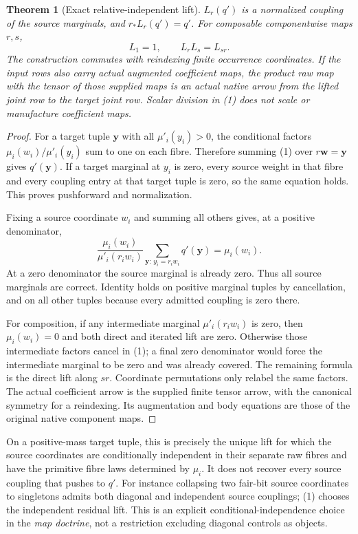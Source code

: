 \documentclass[11pt]{article}
\newtheorem{theorem}{Theorem}\newtheorem{proposition}[theorem]{Proposition}
\begin{document}
\begin{theorem}[Exact relative-independent lift]
$L_r(q')$ is a normalized coupling of the source marginals, and
$r_*L_r(q')=q'$. For composable componentwise maps $r,s$,
\[
 L_1=1,\qquad L_rL_s=L_{sr}.\tag{2}
\]
The construction commutes with reindexing finite occurrence coordinates. If the input rows also carry actual augmented coefficient maps, the product raw map with the tensor of those supplied maps is an actual native arrow from the lifted joint row to the target joint row. Scalar division in (1) does not scale or manufacture coefficient maps.
\end{theorem}
\begin{proof}
For a target tuple $\mathbf y$ with all $\mu'_i(y_i)>0$, the conditional factors $\mu_i(w_i)/\mu'_i(y_i)$ sum to one on each fibre. Therefore summing (1) over $r\mathbf w=\mathbf y$ gives $q'(\mathbf y)$. If a target marginal at $y_i$ is zero, every source weight in that fibre and every coupling entry at that target tuple is zero, so the same equation holds. This proves pushforward and normalization.

Fixing a source coordinate $w_i$ and summing all others gives, at a positive denominator,
\[
 \frac{\mu_i(w_i)}{\mu'_i(r_iw_i)}
 \sum_{\mathbf y:\,y_i=r_iw_i}q'(\mathbf y)=\mu_i(w_i).
\]
At a zero denominator the source marginal is already zero. Thus all source marginals are correct. Identity holds on positive marginal tuples by cancellation, and on all other tuples because every admitted coupling is zero there.

For composition, if any intermediate marginal $\mu'_i(r_iw_i)$ is zero, then $\mu_i(w_i)=0$ and both direct and iterated lift are zero. Otherwise those intermediate factors cancel in (1); a final zero denominator would force the intermediate marginal to be zero and was already covered. The remaining formula is the direct lift along $sr$. Coordinate permutations only relabel the same factors. The actual coefficient arrow is the supplied finite tensor arrow, with the canonical symmetry for a reindexing. Its augmentation and body equations are those of the original native component maps.\end{proof}

On a positive-mass target tuple, this is precisely the unique lift for which the source coordinates are conditionally independent in their separate raw fibres and have the primitive fibre laws determined by $\mu_i$. It does not recover every source coupling that pushes to $q'$. For instance collapsing two fair-bit source coordinates to singletons admits both diagonal and independent source couplings; (1) chooses the independent residual lift. This is an explicit conditional-independence choice in the \emph{map doctrine}, not a restriction excluding diagonal controls as objects.
\end{document}
